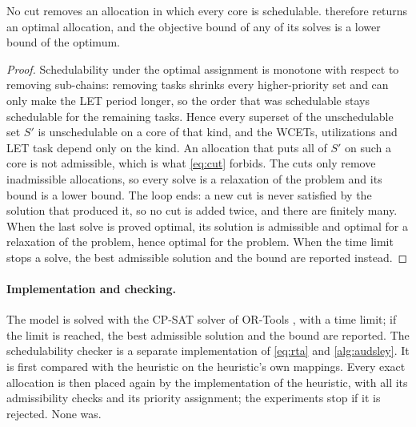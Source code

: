 \begin{proposition}
\label{prop:cuts}
No cut removes an allocation in which every core is schedulable.
 therefore returns an optimal allocation, and the
objective bound of any of its solves is a lower bound of the optimum.
\end{proposition}
\begin{proof}
Schedulability under the optimal assignment is monotone with respect to
removing sub-chains: removing tasks shrinks every higher-priority set and
can only make the LET period longer, so the order that was schedulable
stays schedulable for the remaining tasks. Hence every superset of the
unschedulable set $S'$ is unschedulable on a core of that kind, and the WCETs,
utilizations and LET task depend only on the kind. An allocation that puts
all of $S'$ on such a core is not admissible, which is what \cref{eq:cut}
forbids. The cuts only remove inadmissible allocations, so every solve is
a relaxation of the problem and its bound is a lower bound. The loop ends:
a new cut is never satisfied by the solution that produced it, so no cut
is added twice, and there are finitely many. When the last solve is proved
optimal, its solution is admissible and optimal for a relaxation of the
problem, hence optimal for the problem. When the time limit stops a solve,
the best admissible solution and the bound are reported instead.
\end{proof}

\paragraph{Implementation and checking.} The model is solved with the
CP-SAT solver of OR-Tools \cite{ortools}, with a time limit; if the limit is
reached, the best admissible solution and the bound are reported. The
schedulability checker is a separate implementation of \cref{eq:rta} and
\cref{alg:audsley}. It is first compared with the heuristic on the
heuristic's own mappings. Every exact allocation is then placed again by
the implementation of the heuristic, with all its admissibility checks and
its priority assignment; the experiments stop if it is rejected. None was.
